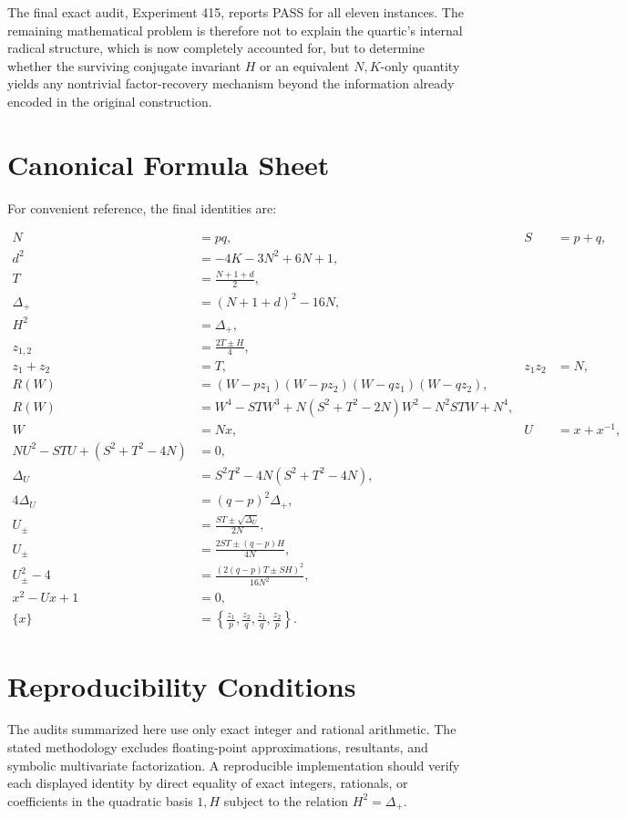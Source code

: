 \documentclass[11pt,a4paper]{article}
\theoremstyle{definition}
\theoremstyle{remark}
\begin{document}
The final exact audit, Experiment 415, reports PASS for all eleven instances. The remaining mathematical problem is therefore not to explain the quartic's internal radical structure, which is now completely accounted for, but to determine whether the surviving conjugate invariant $H$ or an equivalent $N,K$-only quantity yields any nontrivial factor-recovery mechanism beyond the information already encoded in the original construction.

\appendix
\section{Canonical Formula Sheet}

For convenient reference, the final identities are:

\begin{align*}
N&=pq, & S&=p+q,\\
 d^2&=-4K-3N^2+6N+1,\\
 T&=\frac{N+1+d}{2},\\
 \Delta_+&=(N+1+d)^2-16N,\\
 H^2&=\Delta_+,\\
 z_{1,2}&=\frac{2T\pm H}{4},\\
 z_1+z_2&=T, & z_1z_2&=N,\\[2mm]
R(W)&=(W-pz_1)(W-pz_2)(W-qz_1)(W-qz_2),\\
R(W)&=W^4-STW^3+N(S^2+T^2-2N)W^2-N^2STW+N^4,\\[2mm]
W&=Nx, & U&=x+x^{-1},\\
NU^2-STU+(S^2+T^2-4N)&=0,\\
\Delta_U&=S^2T^2-4N(S^2+T^2-4N),\\
4\Delta_U&=(q-p)^2\Delta_+,\\
U_\pm&=\frac{ST\pm\sqrt{\Delta_U}}{2N},\\
U_\pm&=\frac{2ST\pm(q-p)H}{4N},\\
U_\pm^2-4&=\frac{(2(q-p)T\pm SH)^2}{16N^2},\\
x^2-Ux+1&=0,\\
\{x\}&=\left\{\frac{z_1}{p},\frac{z_2}{q},\frac{z_1}{q},\frac{z_2}{p}\right\}.
\end{align*}

\section{Reproducibility Conditions}

The audits summarized here use only exact integer and rational arithmetic. The stated methodology excludes floating-point approximations, resultants, and symbolic multivariate factorization. A reproducible implementation should verify each displayed identity by direct equality of exact integers, rationals, or coefficients in the quadratic basis $1,H$ subject to the relation $H^2=\Delta_+$.
\end{document}
